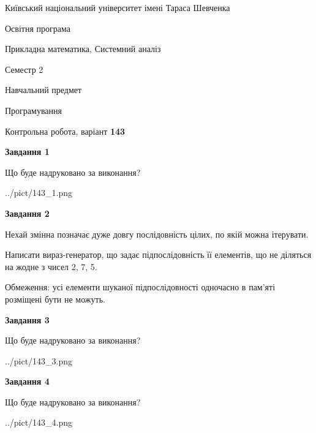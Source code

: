 \documentclass[12pt, ukrainian]{article}
\begin{document}
{{\begin {small}\par
{ \center  Київський національний університет імені Тараса Шевченка \par}
{\parbox {5 cm}{Освітня програма \hfill}{\parbox {8 cm}{Прикладна математика, Системний аналіз \hfill}}\parbox {5 cm}{\hfill Семестр 2}}\par
{\parbox {5 cm} {Навчальний предмет \hfill}\parbox {7 cm}{Програмування \hfill}\parbox {6cm}{\hfill}\par}\vspace{-7pt} \end{small}}{\center Контрольна робота, варіант  \No \textbf
{ 143 }\par}}
{
\begin {large}
{\begin {center}\textbf{Завдання 1}\end {center}}\par
Що буде надруковано за виконання?\par\par
\begin{center}
	{../pict/143_1.png}
\end{center}
\newpage

{\begin {center}\textbf{Завдання 2}\end {center}}\par
Нехай змінна  позначає дуже довгу послідовність цілих, по якій можна ітерувати.

Написати вираз-генератор, що задає підпослідовність її елементів, що не діляться на жодне з чисел 2, 7, 5.

Обмеження: усі елементи шуканої підпослідовності одночасно в пам'яті розміщені бути не можуть.\par
\newpage

{\begin {center}\textbf{Завдання 3}\end {center}}\par
Що буде надруковано за виконання?\par
\begin{center}
	{../pict/143_3.png}
\end{center}
\newpage

{\begin {center}\textbf{Завдання 4}\end {center}}\par
Що буде надруковано за виконання?\par
\begin{center}
	{../pict/143_4.png}
\end{center}
\newpage


\end{large}}
\end{document}
